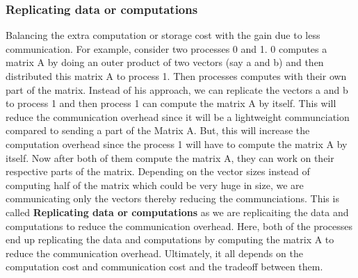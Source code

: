 \documentclass[12pt]{article}
\begin{document}
\subsubsection{Replicating data or computations }
Balancing the extra computation or storage cost with the gain due to less communication.
For example, consider two processes 0 and 1. 0 computes a matrix A by doing an outer product of two vectors (say a and b) and then distributed this matrix A to process 1.
Then processes computes with their own part of the matrix. 
Instead of his approach, we can replicate the vectors a and b to process 1 and then process 1 can compute the matrix A by itself. This will reduce the communication overhead 
since it will be a lightweight communciation compared to sending a part of the Matrix A. But, this will increase the computation overhead since the process 1 will have to compute the matrix A by itself.
Now after both of them compute the matrix A, they can work on their respective parts of the matrix. Depending on the vector sizes instead of computing half of the matrix which could be very huge in size,
we are communicating only the vectors thereby reducing the communciations. This is called \textbf{Replicating data or computations} as we are replicaiting the data and computations to reduce the communication overhead. Here, 
both of the processes end up replicating the data and computations by computing the matrix A to reduce the communication overhead. Ultimately, it all depends on the computation cost and communication cost and the tradeoff between them.
\end{document}
